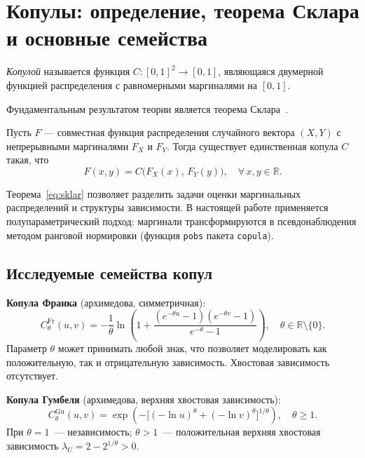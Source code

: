 \section{Копулы: определение, теорема Склара и основные семейства}

\begin{mydefinition}
\emph{Копулой} называется функция $C\colon[0,1]^2\to[0,1]$,
являющаяся двумерной функцией распределения с равномерными маргиналями на $[0,1]$.
\end{mydefinition}

Фундаментальным результатом теории является теорема Склара~\autocite{Sklar1959}.

\begin{mystatement}
Пусть $F$ --- совместная функция распределения случайного вектора
$(X, Y)$ с непрерывными маргиналями $F_X$ и $F_Y$.
Тогда существует единственная копула $C$ такая, что
\begin{equation}
  F(x, y) = C\bigl(F_X(x),\, F_Y(y)\bigr), \quad \forall\, x, y \in \mathbb{R}.
  \label{eq:sklar}
\end{equation}
\end{mystatement}

Теорема~\eqref{eq:sklar} позволяет разделить задачи оценки маргинальных
распределений и структуры зависимости.
В настоящей работе применяется полупараметрический подход:
маргинали трансформируются в псевдонаблюдения методом ранговой нормировки
(функция \texttt{pobs} пакета \texttt{copula}).

\subsection{Исследуемые семейства копул}

\textbf{Копула Франка} (архимедова, симметричная):
\begin{equation}
  C_\theta^{\mathrm{Fr}}(u,v) =
  -\frac{1}{\theta}\ln\!\left(1 + \frac{(e^{-\theta u}-1)(e^{-\theta v}-1)}{e^{-\theta}-1}\right),
  \quad \theta \in \mathbb{R}\setminus\{0\}.
  \label{eq:frank}
\end{equation}
Параметр $\theta$ может принимать любой знак, что позволяет моделировать
как положительную, так и отрицательную зависимость. Хвостовая зависимость отсутствует.

\textbf{Копула Гумбеля} (архимедова, верхняя хвостовая зависимость):
\begin{equation}
  C_\theta^{\mathrm{Gu}}(u,v) =
  \exp\!\left(-\bigl[(-\ln u)^\theta + (-\ln v)^\theta\bigr]^{1/\theta}\right),
  \quad \theta \ge 1.
  \label{eq:gumbel}
\end{equation}
При $\theta = 1$~--- независимость; $\theta > 1$~--- положительная верхняя
хвостовая зависимость $\lambda_U = 2 - 2^{1/\theta} > 0$.

